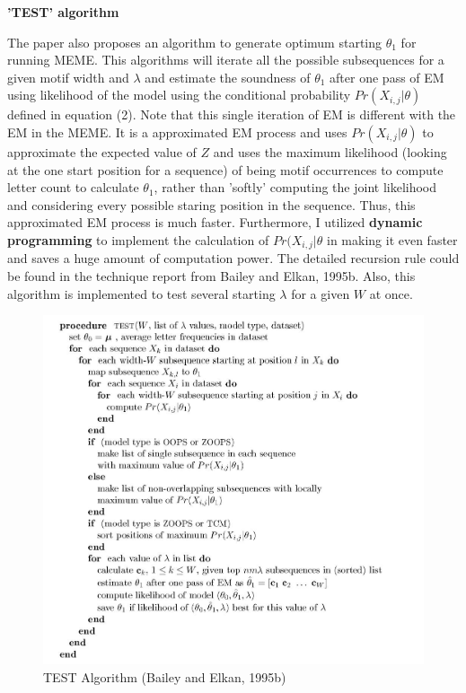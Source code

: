 \documentclass{article}
\begin{document}
\textbf{'TEST' algorithm}

The paper also proposes an algorithm to generate optimum starting $\theta_1$ for running MEME. This algorithms will iterate all the possible subsequences for a given motif width and $\lambda$ and estimate  the soundness of $\theta_1$ after one pass of EM using likelihood of the model using the conditional probability  $Pr(X_{i,j}|\theta)$ defined in equation (2). Note that this single iteration of EM is different with the EM in the MEME. It is a approximated EM process and uses $Pr(X_{i,j}|\theta)$ to approximate the expected value of $Z$ and uses the maximum likelihood (looking at the one start position for a sequence) of being motif occurrences to compute letter count to calculate $\theta_1$, rather than 'softly' computing the joint likelihood and considering every possible staring position in the sequence. Thus, this approximated EM process is much faster. Furthermore, I utilized \textbf{dynamic programming} to implement the calculation of $Pr(X_{i,j}|\theta$ in making it even faster and saves a huge amount of computation power. The detailed recursion rule could be found in the technique report from Bailey and Elkan, 1995b. Also, this algorithm is implemented to test several starting $\lambda$ for a given $W$ at once. 
\begin{figure}[H]
\centering
\includegraphics[scale=0.4]{test.jpg}
\captionsetup{width=.8\linewidth}
\caption{TEST Algorithm (Bailey and Elkan, 1995b)}
\label{fig:1}
\end{figure}
\end{document}
